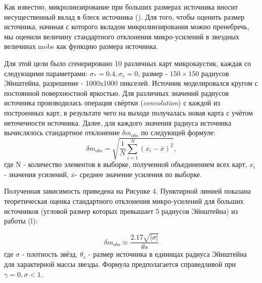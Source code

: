 Как известно, микролинзирование при больших размерах источника вносит несущественный вклад в блеск источника (\cite{schneider1992}). Для того, чтобы оценить размер источника, начиная с которого вкладом микролинзирования можно пренебречь, мы оценили величину стандартного отклонения микро-усилений в звездных величинах mobs как функцию размера источника. 

Для этой цели было сгенерировано 10 различных карт микрокаустик, каждая со следующими параметрами: $\sigma_*=0.4, \sigma_c = 0$, размер - $ 150 \times 150 $ радиусов Эйнштейна, разрешение - 1000x1000 пикселей. Источник моделировался кругом с постоянной поверхностной яркостью. Для различных значений радиусов источника производилась операция свёртки (\textit{convolution}) с каждой из построенных карт, в результате чего на выходе получалась новая карта с учётом неточечности источника. Далее, для каждого значения радиуса источника вычислялось стандартное отклонение  $\delta m_{o b s}$ по следующей формуле: 
\begin{equation}
\delta m_{o b s}=\sqrt{\frac{1}{N} \sum_{i=1}^{N}\left(x_{i}-\overline{x}\right)^{2}},
\end{equation}
где N - количество элементов в выборке, полученной объединением всех карт, $x_i$ - значения усилений, $\overline x$- среднее значение усиления по выборке.

Полученная зависимость приведена на Рисунке 4. Пунктирной линией показана теоретическая оценка стандартного отклонения микро-усилений для больших источников (угловой размер которых превышает 5 радиусов Эйнштейна) из работы (\cite{refsdalstabell1991}l):

\begin{equation}
\delta m_{o b s} \approx \frac{2.17 \sqrt{|\sigma|}}{\theta s}
\end{equation}
где $\sigma$ - плотность звёзд, $\theta_s$ - размер источника в единицах радиуса Эйнштейна для характерной массы звезды. Формула предполагается справедливой при $\gamma=0, \sigma < 1$. 

